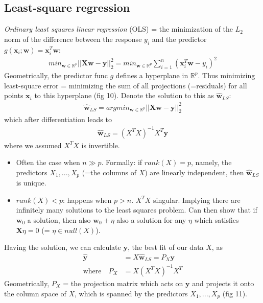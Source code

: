 \documentclass[norsk,a4paper,11pt]{article}
\begin{document}
\subsection{Least-square regression}
\textit{Ordinary least squares linear regression} (OLS) = the minimization of the $L_2$ norm of the difference between the response $y_i$ and the predictor $g(\mathbf{x}_i ; \mathbf{w}) = \mathbf{x}_i^T \mathbf{w}$:
\begin{align}
	min_{\mathbf{w} \in \mathbb{R}^p} ||\mathbf{X}\mathbf{w} - \mathbf{y}||_2^2 = min_{\mathbf{w} \in \mathbb{R}^p} \sum_{i=1}^n (\mathbf{x}_i^T \mathbf{w} - y_i)^2
\end{align}
Geometrically, the predictor func $g$ defines a hyperplane in $\mathbb{R}^p$. Thus minimizing least-square error = minimizing the sum of all projections (=residuals) for all points $\mathbf{x}_i$ to this hyperplane (fig 10). Denote the solution to this as $\hat{\mathbf{w}}_{LS}$:
\begin{align}
	\hat{\mathbf{w}}_{LS} = argmin_{\mathbf{w} \in \mathbb{R}^p} ||\mathbf{X}\mathbf{w} - \mathbf{y}||_2^2
\end{align}
which after differentiation leads to
\begin{align}
	\hat{\mathbf{w}}_{LS} = (X^T X)^{-1} X^T \mathbf{y}
\end{align}
where we assumed $X^T X$ is invertible. 
\begin{itemize}
	\item Often the case when $n \gg p$. Formally: if $rank(X) = p$, namely, the predictors $X_1, ..., X_p$ (=the columns of $X$) are linearly independent, then $\hat{\mathbf{w}}_{LS}$ is unique.
	\item $rank(X) < p$: happens when $p>n$. $X^T X$ singular. Implying there are infinitely many solutions to the least squares problem. Can then show that if $\mathbf{w}_0$ a solution, then also $\mathbf{w}_0 + \eta$ also a solution for any $\eta$ which satisfies $\mathbf{X}\eta = 0$ (= $\eta \in null(X)$). 
\end{itemize}
Having the solution, we can calculate $\mathbf{y}$, the best fit of our data $X$, as
\begin{align}
	\hat{\mathbf{y}} &= X \hat{\mathbf{w}}_{LS} = P_X \mathbf{y} \\
	\text{where} \quad P_X &= X(X^T X)^{-1} X^T
\end{align}
Geometrically, $P_X$ = the projection matrix which acts on $\mathbf{y}$ and projects it onto the column space of $X$, which is spanned by the predictors $X_1, ..., X_p$ (fig 11).
\end{document}
